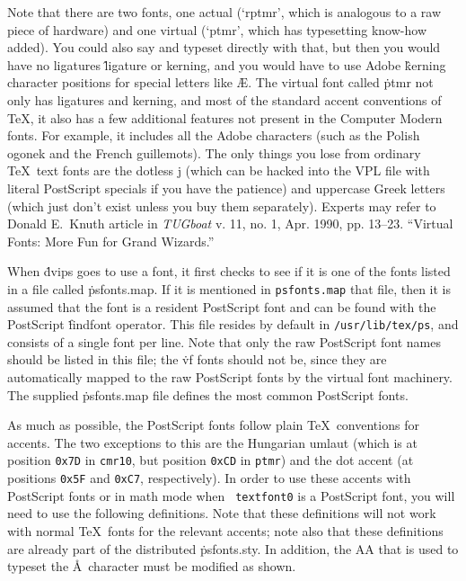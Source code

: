 Note that there are two fonts, one actual (`rptmr',
which is analogous to a raw piece of hardware) and one virtual
(`ptmr', which has typesetting know-how added). You could also say
\noindent
and typeset directly with that, but then you would have no ligatures
\^{ligature}
or kerning, and you would have to use Adobe
\^{kerning}
character positions for special letters like \AE. The virtual font
called \.{ptmr} not only has ligatures and kerning, and most of the
standard accent conventions of \TeX, it also has a few additional
features not present in the Computer Modern fonts. For example, it
includes all the Adobe characters (such as the Polish ogonek and the
French guillemots).  The only things you lose from ordinary \TeX\ text
fonts are the dotless j (which can be hacked into the VPL file with
literal PostScript specials if you have the patience) and uppercase
Greek letters (which just don't exist unless you buy them separately).
Experts may refer to Donald E.~Knuth article in {\it TUGboat} v. 11,
no. 1, Apr. 1990, pp. 13--23.  ``Virtual Fonts: More Fun for Grand
Wizards.''

When \.{dvips} goes to use a font, it first checks to see if it is one of
the fonts listed in a file called \.{psfonts.map}.  If it is mentioned in
\^{{\tt psfonts.map}}
that file, then it is assumed that the font is a resident PostScript font
and can be found with the PostScript \.{findfont} operator.  This file
resides by default in {\tt /usr/lib/tex/ps}, and consists of a single font
per line.  Note that only the raw PostScript font names should be listed
in this file; the \.{vf} fonts should not be, since they are automatically
mapped to the raw PostScript fonts by the virtual font machinery.
The supplied \.{psfonts.map} file defines the most common PostScript fonts.

As much as possible, the PostScript fonts follow plain \TeX\ conventions
for accents.  The two exceptions to this are the Hungarian umlaut (which
is at position {\tt 0x7D} in {\tt cmr10}, but position {\tt 0xCD} in
{\tt ptmr}) and the dot accent (at positions {\tt 0x5F} and {\tt 0xC7},
respectively).  In order to use these accents with PostScript fonts or in
math mode when {\tt {} textfont0} is a PostScript font, you will need
to use the following definitions.  Note that these definitions will not work
with normal \TeX\ fonts for the relevant accents; note also that these
definitions are already part of the distributed \.{psfonts.sty}.
In addition, the \.{ AA} that is used to typeset the \AA\ character
must be modified as shown.

